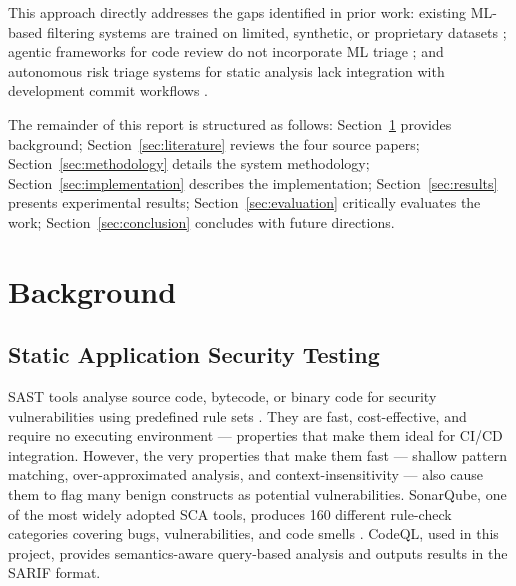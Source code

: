 \documentclass[conference]{IEEEtran}
\begin{document}
This approach directly addresses the gaps identified in prior work: existing
ML-based filtering systems are trained on limited, synthetic, or proprietary
datasets \cite{hegedus2022sca}; agentic frameworks for code review do not
incorporate ML triage \cite{charoenwet2026agenticscr}; and autonomous risk triage
systems for static analysis lack integration with development commit workflows
\cite{bakane2025thesis}.

The remainder of this report is structured as follows:
Section~\ref{sec:background} provides background;
Section~\ref{sec:literature} reviews the four source papers;
Section~\ref{sec:methodology} details the system methodology;
Section~\ref{sec:implementation} describes the implementation;
Section~\ref{sec:results} presents experimental results;
Section~\ref{sec:evaluation} critically evaluates the work;
Section~\ref{sec:conclusion} concludes with future directions.

\section{Background}
\label{sec:background}

\subsection{Static Application Security Testing}

SAST tools analyse source code, bytecode, or binary code for security
vulnerabilities using predefined rule sets \cite{hegedus2022sca}. They are
fast, cost-effective, and require no executing environment --- properties that
make them ideal for CI/CD integration. However, the very properties that make
them fast --- shallow pattern matching, over-approximated analysis, and
context-insensitivity --- also cause them to flag many benign constructs as
potential vulnerabilities. SonarQube, one of the most widely adopted SCA tools,
produces 160 different rule-check categories covering bugs, vulnerabilities, and
code smells \cite{hegedus2022sca}. CodeQL, used in this project, provides
semantics-aware query-based analysis and outputs results in the SARIF format.
\end{document}
